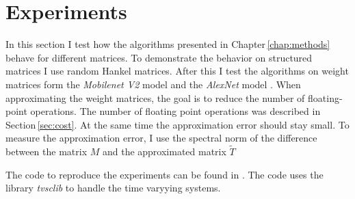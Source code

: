 \documentclass[doctype=mastersthesis,BCOR=15mm,biblatex]{ldvbook}%
\DeclareMathOperator{\length}{len}
\begin{document}








\chapter{Experiments}\label{chap:experiments}

In this section I test how the algorithms presented in Chapter\,\ref{chap:methods} behave for different matrices.
To demonstrate the behavior on structured matrices I use random Hankel matrices.
After this I test the algorithms on weight matrices form the \emph{Mobilenet V2} model \cite{sandler_mobilenetv2_2019} and the \emph{AlexNet} model \cite{krizhevsky_one_2014}.
When approximating the weight matrices, the goal is to reduce the number of floating-point operations.
The number of floating point operations was described in Section\,\ref{sec:cost}.
At the same time the approximation error should stay small.
To measure the approximation error, I use the spectral norm of the difference between the matrix $M$ and the approximated matrix $\tilde{T}$

The code to reproduce the experiments can be found in .
The code uses the library \emph{tvsclib} \cite{kissel_time_2022} to handle the time varyying systems.
\end{document}
